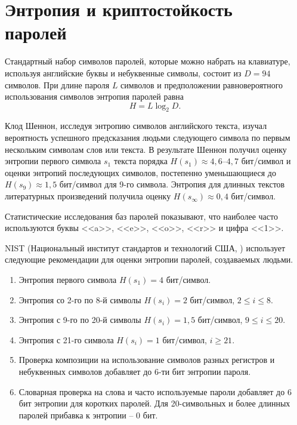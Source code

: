 \section[Энтропия и криптостойкость паролей]{Энтропия и криптостойкость \protect\\ паролей}

Стандартный набор символов паролей, которые можно набрать на клавиатуре, используя английские буквы и небуквенные символы, состоит из $D=94$ символов. При длине пароля $L$ символов и предположении равновероятного использования символов энтропия паролей равна
    \[ H = L \log_2 D. \]

Клод Шеннон, исследуя энтропию символов английского текста, изучал вероятность успешного предсказания людьми следующего символа по первым нескольким символам слов или текста. В результате Шеннон получил оценку энтропии первого символа $s_1$ текста порядка $H(s_1) \approx 4{,}6$--$4{,}7$ бит/символ и оценки энтропий последующих символов, постепенно уменьшающиеся до $H(s_9) \approx 1{,}5$ бит/символ для 9-го символа. Энтропия для длинных текстов литературных произведений получила оценку $H(s_\infty) \approx 0{,}4$ бит/символ.

Статистические исследования баз паролей показывают, что наиболее часто используются буквы <<a>>, <<e>>, <<o>>, <<r>> и цифра <<1>>.

NIST (Национальный институт стандартов и технологий США, )  использует следующие рекомендации для оценки энтропии паролей, создаваемых людьми.
\begin{enumerate}
    \item Энтропия первого символа $H(s_1) = 4$ бит/символ.
    \item Энтропия со 2-го по 8-й символы $H(s_{i}) = 2$ бит/символ, $2 \leq i \leq 8$.
    \item Энтропия с 9-го по 20-й символы $H(s_{i}) = 1{,}5$ бит/символ, $9 \leq i \leq 20$.
    \item Энтропия с 21-го символа $H(s_{i}) = 1$ бит/символ, $i \geq 21$.
    \item Проверка композиции на использование символов разных регистров и небуквенных символов добавляет до 6-ти бит энтропии пароля.
    \item Словарная проверка на слова и часто используемые пароли добавляет до 6 бит энтропии для коротких паролей. Для 20-символьных и более длинных паролей прибавка к энтропии -- 0 бит.
\end{enumerate}

